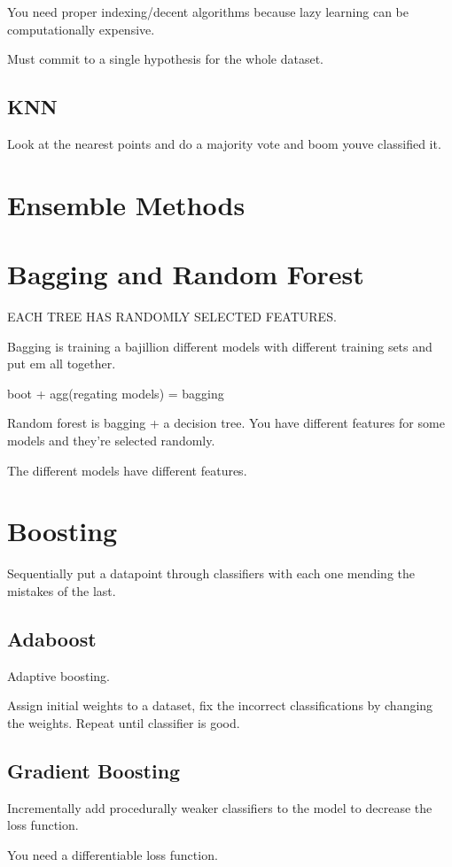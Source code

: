 \documentclass[fleqn]{report}
\begin{document}
You need proper indexing/decent algorithms because lazy learning can be 
computationally expensive.

Must commit to a single hypothesis for the whole dataset.

\subsection{KNN}
Look at the nearest points and do a majority vote and boom youve classified it. 

\section{Ensemble Methods}

\section{Bagging and Random Forest}
EACH TREE HAS RANDOMLY SELECTED FEATURES.

Bagging is training a bajillion different models with different training sets 
and put em all together.

boot + agg(regating models) = bagging

Random forest is bagging + a decision tree. You have different features 
for some models and they're selected randomly. 

The different models have different features. 

\section{Boosting}
Sequentially put a datapoint through classifiers with each one 
mending the mistakes of the last.

\subsection{Adaboost}
Adaptive boosting.

Assign initial weights to a dataset, fix the incorrect classifications by 
changing the weights. Repeat until classifier is good. 

\subsection{Gradient Boosting}
Incrementally add procedurally weaker classifiers to the model to decrease 
the loss function.

You need a differentiable loss function. 
\end{document}
